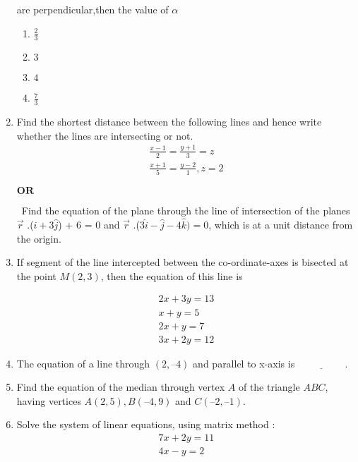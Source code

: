 \documentclass{article}
\begin{document}
\begin{enumerate}
\begin{center}
    \end{center}
    are perpendicular,then the value of $\alpha$ \\
    \begin{enumerate}
        \item $\frac{2}{3}$
        \item $3$
        \item $4$
        \item $\frac{7}{3}$
    \end{enumerate}
    \item Find the shortest distance between the following lines and hence write
whether the lines are intersecting or not.\\
\begin{align}
    \frac{x-1}{2} = \frac{y+1}{3} = z\\ 
    \frac{x+1}{5}=\frac{y-2}{1},z=2
\end{align}
\begin{center}
    $\textbf{OR}$
\end{center}
\ Find the equation of the plane through the line of intersection of the planes \\
    $ \overrightarrow{r}$ .($\hat{i}+3\hat{j}$) + $6$ = $0$  and  $ \overrightarrow{r}$ .($3\hat{i} - \hat{j} - 4\hat{k}) = 0$, which is at a unit distance from the origin.\\
    \item If segment of the line intercepted between the co-ordinate-axes is bisected
at the point $M(2, 3)$, then the equation of this line is
\begin{enumerate} 
\begin{align}
      2x + 3y = 13\\
  x + y = 5\\
       2x + y = 7\\
      3x + 2y = 12 
 \end{align} 
\end{enumerate}
\item The equation of a line through $(2, – 4)$ and parallel to x-axis is $\underline{\hspace{2cm}}$.\\
\item Find the equation of the median through vertex $A$ of the triangle $ABC$, having vertices $A(2, 5), B(– 4, 9)$ and $C(– 2, – 1)$. \\
\item Solve the system of linear equations, using matrix method : 
\begin{align}
    7x + 2y = 11\\
    4x - y = 2
\end{align}   
\end{enumerate}
\end{document}
